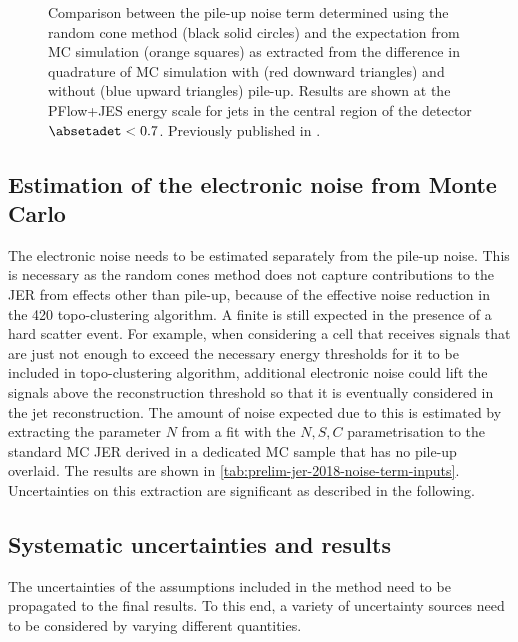\begin{figure}[t]
    \caption{Comparison between the pile-up noise term \Npileup determined using the random cone method (black solid circles) and the expectation from MC simulation (orange squares) as extracted from the difference in quadrature of MC simulation with (red downward triangles) and without (blue upward triangles) pile-up. Results are shown at the PFlow+JES energy scale for jets in the central region of the detector $\absetadet < 0.7$. Previously published in .}
    \label{fig:non-closure}
\end{figure}



\subsection{Estimation of the electronic noise from Monte Carlo}
\label{subsec:electronic-noise-extraction}
The electronic noise needs to be estimated separately from the pile-up noise. 
This is necessary as the random cones method does not capture contributions to the JER from effects other than pile-up, because of the effective noise reduction in the 420 topo-clustering algorithm.
A finite \Nmuzero is still expected in the presence of a hard scatter event.
For example, when considering a cell that receives signals that are just not enough to exceed the necessary energy thresholds for it to be included in topo-clustering algorithm, additional electronic noise could lift the signals above the reconstruction threshold so that it is eventually considered in the jet reconstruction.
The amount of noise expected due to this is estimated by extracting the parameter $N$ from a fit with the $N, S, C$ parametrisation to the standard MC JER derived in a dedicated MC sample that has no pile-up overlaid. 
The results are shown in \cref{tab:prelim-jer-2018-noise-term-inputs}.
Uncertainties on this extraction are significant as described in the following.

\subsection{Systematic uncertainties and results}
The uncertainties of the assumptions included in the method need to be propagated to the final results. To this end, a variety of uncertainty sources need to be considered by varying different quantities. 

